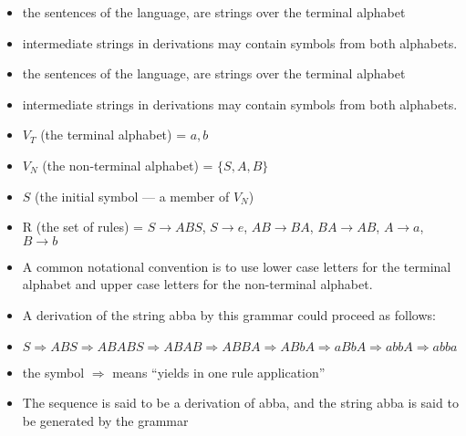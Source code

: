 \documentclass{beamer}
\begin{document}
	\begin{frame}
		\begin{itemize}
			\item the sentences of the language, are strings over the terminal alphabet
			\item intermediate strings in derivations may contain symbols from both alphabets.
		\end{itemize}
	\end{frame}


	\begin{frame}
		\begin{itemize}
			\item the sentences of the language, are strings over the terminal alphabet
			\item intermediate strings in derivations may contain symbols from both alphabets.
		\end{itemize}
	\end{frame}


	\begin{frame}
		\begin{itemize}
			\item $V_T$ (the terminal alphabet) = {$a, b$}
			\item $V_N$ (the non-terminal alphabet) = $\{S, A, B\}$
			\item $S$ (the initial symbol --- a member of $V_N$)
			\item R (the set of rules) = $S \rightarrow ABS$, $S \rightarrow e$, $AB \rightarrow BA$, $BA \rightarrow AB$, $A \rightarrow a$, $B \rightarrow b$
		\end{itemize}
	\end{frame}


	\begin{frame}
		\begin{itemize}
			\item A common notational convention is to use lower case letters for the terminal alphabet and upper case letters for the non-terminal alphabet.
		\end{itemize}
	\end{frame}


	\begin{frame}
		\begin{itemize}
			\item A derivation of the string abba by this grammar could proceed as follows:
			\item $S \Longrightarrow ABS \Longrightarrow ABABS \Longrightarrow ABAB \Longrightarrow ABBA \Longrightarrow ABbA \Longrightarrow aBbA \Longrightarrow abbA \Longrightarrow abba$
			\item the symbol $\Longrightarrow$ means ``yields in one rule application''
			\item The sequence is said to be a derivation of abba, and the string abba is said to be generated by the grammar
		\end{itemize}
	\end{frame}
\end{document}
